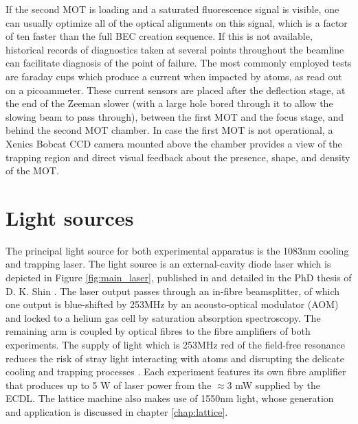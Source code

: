 	If the second MOT is loading and a saturated fluorescence signal is visible, one can usually optimize all of the optical alignments on this signal, which is a factor of ten faster than the full BEC creation sequence. If this is not available, historical records of diagnostics taken at several points throughout the beamline can facilitate diagnosis of the point of failure. The most commonly employed tests are faraday cups which produce a current when impacted by \mhe atoms, as read out on a picoammeter. These current sensors are placed after the deflection stage, at the end of the Zeeman slower (with a large hole bored through it to allow the slowing beam to pass through), between the first MOT and the focus stage, and behind the second MOT chamber. In case the first MOT is not operational, a Xenics Bobcat CCD camera mounted above the chamber provides a view of the trapping region and direct visual feedback about the presence, shape, and density of the MOT. 

\section{Light sources}\label{ssec:lasers}
	
	The principal light source for both experimental apparatus is the 1083nm cooling and trapping laser. The light source is an external-cavity diode laser which is depicted in Figure \ref{fig:main_laser}, published in \cite{shin16} and detailed in the PhD thesis of D. K. Shin \cite{ShinThesis}. The laser output passes through an in-fibre beamsplitter, of which one output is blue-shifted by 253MHz by an acousto-optical modulator (AOM) and locked to a helium gas cell by saturation absorption spectroscopy. The remaining arm is coupled by optical fibres to the fibre amplifiers of both experiments. The supply of light which is 253MHz red of the field-free resonance reduces the risk of stray light interacting with atoms and disrupting the delicate cooling and trapping processes . Each experiment features its own fibre amplifier that produces up to 5 W of laser power from the $\approx$3 mW supplied by the ECDL. The lattice machine also makes use of 1550nm light, whose generation and application is discussed in chapter \ref{chap:lattice}.

